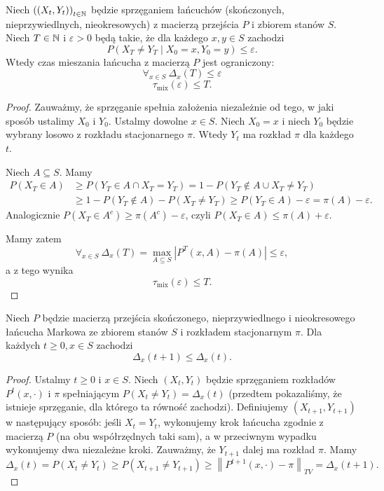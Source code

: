 \begin{lemma}
    Niech $\left( \left( X_t,Y_t \right)  \right) _{t \in \mathbb{N}}$ będzie sprzęganiem łańcuchów (skończonych, nieprzywiedlnych, nieokresowych) z macierzą przejścia $P$ i zbiorem stanów $S$. Niech $T \in \mathbb{N}$ i $\varepsilon > 0$ będą takie, że dla każdego $x,y \in S$ zachodzi
    $$ P\left( X_T \neq Y_T \mid X_0 = x, Y_0 = y  \right) \le \varepsilon. $$ 
    Wtedy czas mieszania łańcucha z macierzą $P$ jest ograniczony:
    $$ \forall_{x \in S} \   \Delta_x\left( T \right) \le \varepsilon $$ 
    $$ \tau_{\mathrm{mix}}\left( \varepsilon  \right) \le T. $$ 
\end{lemma}
\begin{proof}
    Zauważmy, że sprzęganie spełnia założenia niezależnie od tego, w jaki sposób ustalimy $X_0$ i $Y_0$. Ustalmy dowolne $x \in S$. Niech $X_0 = x $ i niech $Y_0$ będzie wybrany losowo z rozkładu stacjonarnego $\pi$. Wtedy $Y_t$ ma rozkład $\pi$ dla każdego $t$.

    Niech $A \subseteq S$. Mamy
    \begin{align*}
        P\left( X_T \in A  \right) &\ge P\left( Y_T \in A \cap X_T = Y_T \right) = 1- P\left( Y_T \notin A \cup X_T \neq Y_T \right) \\ 
        &\ge 1-P\left( Y_T \notin A  \right) - P\left( X_T \neq Y_T \right) \ge P\left( Y_T \in A  \right) - \varepsilon = \pi\left( A  \right) - \varepsilon.
    \end{align*}
    Analogicznie $P\left( X_T \in A^{c} \right) \ge \pi\left( A^{c} \right) - \varepsilon $, czyli $P\left( X_T \in A  \right) \le \pi\left( A  \right) + \varepsilon $.

    Mamy zatem
    $$ \forall_{x \in S} \ \Delta_x\left( T \right) =  \max_{A \subseteq S} \left|P^{T}\left( x,A \right) - \pi\left( A  \right) \right|\le \varepsilon,$$ 
    a z tego wynika
    $$ \tau_{\mathrm{mix}}\left( \varepsilon  \right) \le T. $$ 
\end{proof}

\begin{lemma}[O monotoniczności]
   Niech $P$ będzie macierzą przejścia skończonego, nieprzywiedlnego i nieokresowego łańcucha Markowa ze zbiorem stanów $S$ i rozkładem stacjonarnym $\pi$. Dla każdych $t\ge 0, x \in S$ zachodzi
   $$ \Delta_x\left( t+1 \right) \le \Delta_x\left( t  \right) . $$ 
\end{lemma}
\begin{proof}
    Ustalmy $t\ge 0$ i $x \in S$. Niech $\left( X_t,Y_t \right) $ będzie sprzęganiem rozkładów $P^{t}\left( x,\cdot  \right) $ i $\pi$ spełniającym $P\left( X_t \neq Y_t \right) = \Delta_x\left( t  \right) $ (przedtem pokazaliśmy, że istnieje sprzęganie, dla którego ta równość zachodzi). Definiujemy $\left( X_{t+1},Y_{t+1} \right) $ w następujący sposób: jeśli $X_t = Y_t$, wykonujemy krok łańcucha zgodnie z macierzą $P$ (na obu współrzędnych taki sam), a w przeciwnym wypadku wykonujemy dwa niezależne kroki. Zauważmy, że $Y_{t+1}$ dalej ma rozkład $\pi$. Mamy
    $$ \Delta_x\left( t  \right) = P\left( X_t \neq Y_t \right) \ge P\left( X_{t+1}\neq Y_{t+1} \right) \ge \left\|P^{t+1}\left( x,\cdot  \right) - \pi \right\|_{TV} = \Delta_x\left( t+1 \right) . $$ 
\end{proof}

